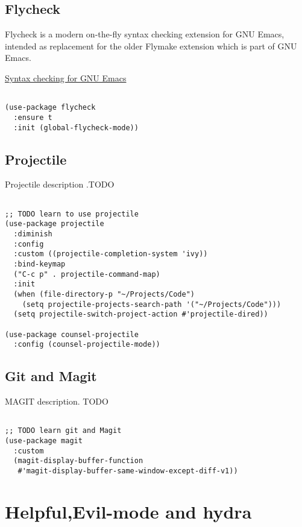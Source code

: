 \documentclass[11pt]{article}
\begin{document}
\subsection{Flycheck}
\label{sec:orga1ed178}

Flycheck is a modern on-the-fly syntax checking extension for GNU Emacs, intended as replacement for the older Flymake extension which is part of GNU Emacs.

\href{https://www.flycheck.org/}{Syntax checking for GNU Emacs
}
\begin{verbatim}

(use-package flycheck
  :ensure t
  :init (global-flycheck-mode))

\end{verbatim}

\subsection{Projectile}
\label{sec:orgcd510e3}

Projectile description .TODO

\begin{verbatim}

;; TODO learn to use projectile
(use-package projectile
  :diminish
  :config
  :custom ((projectile-completion-system 'ivy))
  :bind-keymap
  ("C-c p" . projectile-command-map)
  :init
  (when (file-directory-p "~/Projects/Code")
    (setq projectile-projects-search-path '("~/Projects/Code")))
  (setq projectile-switch-project-action #'projectile-dired))

(use-package counsel-projectile
  :config (counsel-projectile-mode))

\end{verbatim}

\subsection{Git and Magit}
\label{sec:org8d926e0}

MAGIT description. TODO

\begin{verbatim}

;; TODO learn git and Magit
(use-package magit
  :custom
  (magit-display-buffer-function
   #'magit-display-buffer-same-window-except-diff-v1))

\end{verbatim}

\section{Helpful,Evil-mode and hydra}
\label{sec:orgfe7ac2e}
\end{document}
